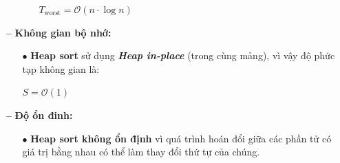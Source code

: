 \begin{itemize}
\begin{itemize}
\begin{itemize}
\begin{center}
                $T_{\text{worst}} = \mathcal{O}(n \cdot \log n)$
            \end{center}
        \end{itemize}
    \end{itemize}
    \item [\textbf{--}] \textbf{Không gian bộ nhớ:}
    \begin{itemize}
        \item [$\bullet$] \textbf{Heap sort} sử dụng \textbf{\textit{Heap in-place}} (trong cùng mảng), vì vậy độ phức tạp không gian là:
        \begin{center}
            $S = \mathcal{O}(1)$
        \end{center}
    \end{itemize}
    \item [\textbf{--}] \textbf{Độ ổn đinh:}
    \begin{itemize}
        \item [$\bullet$] \textbf{Heap sort không ổn định} vì quá trình hoán đổi giữa các phần tử có giá trị bằng nhau có thể làm thay đổi thứ tự của chúng.
    \end{itemize}
\end{itemize}
